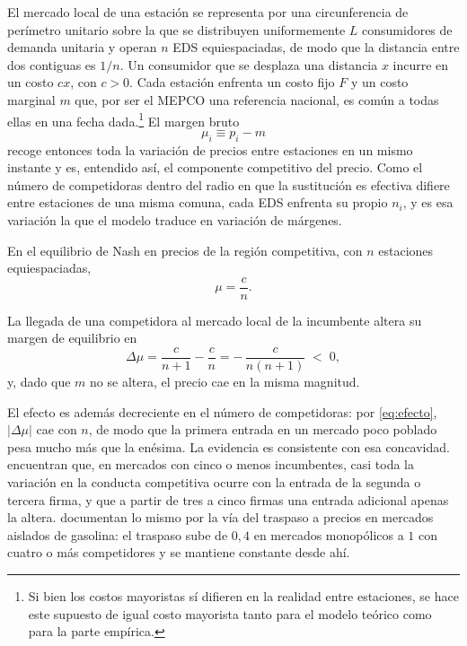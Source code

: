 El mercado local de una estación se representa por una circunferencia de perímetro unitario sobre la que se distribuyen uniformemente $L$ consumidores de demanda unitaria y operan $n$ EDS equiespaciadas, de modo que la distancia entre dos contiguas es $1/n$. Un consumidor que se desplaza una distancia $x$ incurre en un costo $cx$, con $c>0$. Cada estación enfrenta un costo fijo $F$ y un costo marginal $m$ que, por ser el MEPCO una referencia nacional, es común a todas ellas en una fecha dada.\footnote{Si bien los costos mayoristas sí difieren en la realidad entre estaciones, se hace este supuesto de igual costo mayorista tanto para el modelo teórico como para la parte empírica.} El margen bruto
\begin{equation}
    \mu_i \equiv p_i - m
    \label{eq:def-margen}
\end{equation}
recoge entonces toda la variación de precios entre estaciones en un mismo instante y es, entendido así, el componente competitivo del precio. Como el número de competidoras dentro del radio en que la sustitución es efectiva difiere entre estaciones de una misma comuna, cada EDS enfrenta su propio $n_i$, y es esa variación la que el modelo traduce en variación de márgenes.

\begin{proposicion}
\label{prop:margen}
En el equilibrio de Nash en precios de la región competitiva, con $n$ estaciones
equiespaciadas,
\begin{equation}
    \mu = \frac{c}{n} .
    \label{eq:margen}
\end{equation}
\end{proposicion}

\begin{corolario}
\label{cor:entrada}
La llegada de una competidora al mercado local de la incumbente altera su margen
de equilibrio en
\begin{equation}
    \Delta\mu = \frac{c}{n+1} - \frac{c}{n} = -\,\frac{c}{n(n+1)} \;<\; 0 ,
    \label{eq:efecto}
\end{equation}
y, dado que $m$ no se altera, el precio cae en la misma magnitud.
\end{corolario}

El efecto es además decreciente en el número de competidoras: por \eqref{eq:efecto}, $|\Delta\mu|$ cae con $n$, de modo que la primera entrada en un mercado poco poblado pesa mucho más que la enésima. La evidencia es consistente con esa concavidad. \textcite{BRESNAHAN1991} encuentran que, en mercados con cinco o menos incumbentes, casi toda la variación en la conducta competitiva ocurre con la entrada de la segunda o tercera firma, y que a partir de tres a cinco firmas una entrada adicional apenas la altera. \textcite{GENAKOS2022} documentan lo mismo por la vía del traspaso a precios en mercados aislados de gasolina: el traspaso sube de $0{,}4$ en mercados monopólicos a $1$ con cuatro o más competidores y se mantiene constante desde ahí.

